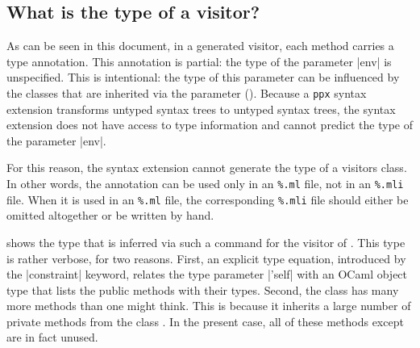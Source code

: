 \documentclass[11pt,a4paper,twoside]{article}
\begin{document}

\subsection{What is the type of a visitor?}
\label{sec:intro:type}

As can be seen in this document,
in a generated visitor,
each method carries a type annotation.
%
This annotation is partial:
the type of the parameter \oc|env| is unspecified.
%
This is intentional:
the type of this parameter
can be influenced
by the classes that are inherited via the \ancestors parameter
().
%
Because a \texttt{ppx} syntax extension transforms
untyped syntax trees to untyped syntax trees, the \visitors syntax extension
does not have access to type information
and cannot predict the type of the parameter \oc|env|.

For this reason, the \visitors syntax extension cannot generate the type of a
visitors class. In other words, the annotation \derivingvisitors can be used
only in an \texttt{\%.ml} file, not in an \texttt{\%.mli} file. When it is
used in an \texttt{\%.ml} file, the corresponding \texttt{\%.mli} file should
either be omitted altogether or be written by hand.




 shows the type that is inferred via such a command for the
\iter visitor of . This type is rather verbose, for two
reasons. First, an explicit type equation, introduced by the \oc|constraint|
keyword, relates the type parameter \oc|'self| with an OCaml object type that
lists the public methods with their types. Second, the class \iter has many more
methods than one might think. This is because it inherits a large number of
private methods from the class . In the present case, all of
these methods except  are in fact unused.
\end{document}
